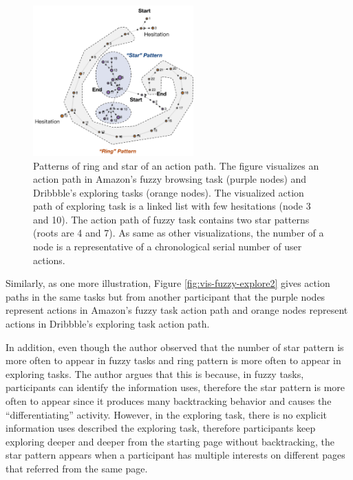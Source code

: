 \begin{figure}[H]
    \centering
    \includegraphics[width=0.55\textwidth]{figures/vis-patterns1}
    \caption{Patterns of ring and star of an action path. The figure visualizes an action path in
    Amazon's fuzzy browsing task (purple nodes) and Dribbble's exploring tasks (orange nodes). 
    The visualized action path of exploring task is a linked list with few hesitations (node 3 and 10).
    The action path of fuzzy task contains two star patterns (roots are 4 and 7).
    As same as other visualizations, the number of a node
    is a representative of a chronological serial number of user actions.}
    \label{fig:vis-fuzzy-explore1}
\end{figure}

Similarly, as one more illustration, Figure \ref{fig:vis-fuzzy-explore2} gives action paths 
in the same tasks but from another participant that the purple nodes represent actions in Amazon's fuzzy task action path
and orange nodes represent actions in Dribbble's exploring task action path.


In addition, even though the author observed that the number of star pattern is more often to appear
in fuzzy tasks and ring pattern is more often to appear in exploring tasks.
The author argues that this is because, in fuzzy tasks, participants can identify the
information uses, therefore the star pattern is more often to appear since it produces many backtracking
behavior and causes the ``differentiating'' activity. However, in the exploring task,
there is no explicit information uses described the exploring task, therefore participants
keep exploring deeper and deeper from the starting page without backtracking, the star pattern
appears when a participant has multiple interests on different pages that referred from the same page.

